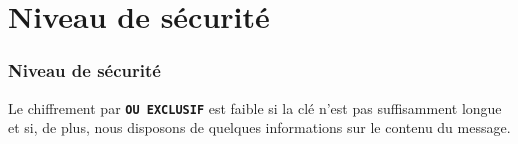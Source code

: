 \documentclass[svgnames,11pt]{beamer}
\begin{document}
\section{Niveau de sécurité}
\begin{frame}
    \frametitle{Niveau de sécurité}

Le chiffrement par \textbf{\texttt{OU EXCLUSIF}} est faible si la clé n'est pas suffisamment longue et si, de plus, nous disposons de quelques informations sur le contenu du message.

\end{frame}
\end{document}
